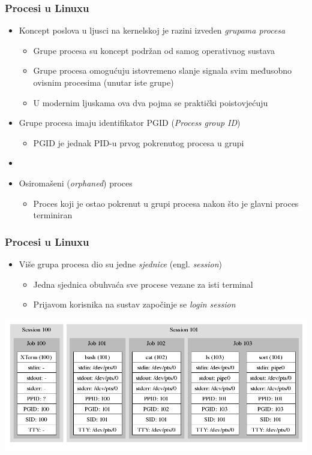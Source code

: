 \documentclass[table,usenames,dvipsnames]{beamer}
\begin{document}
\begin{frame}[t]
	\frametitle{Procesi u Linuxu}
	\begin{itemize}
		\item Koncept poslova u ljusci na kernelskoj je razini izveden \emph{grupama procesa}
		\begin{itemize}
			\item Grupe procesa su koncept podržan od samog operativnog sustava
			\item Grupe procesa omogućuju istovremeno slanje signala svim međusobno ovisnim procesima (unutar iste grupe)
			\item U modernim ljuskama ova dva pojma se praktički poistovjećuju
		\end{itemize}
		\item Grupe procesa imaju identifikator PGID (\emph{Process group ID})
		\begin{itemize}
			\item PGID je jednak PID-u prvog pokrenutog procesa u grupi
		\end{itemize}
		\item[]
		\item Osiromašeni (\emph{orphaned}) proces
		\begin{itemize}
			\item Proces koji je ostao pokrenut u grupi procesa nakon što je glavni proces terminiran
		\end{itemize}
	\end{itemize}
\end{frame}


\begin{frame}[t]
	\frametitle{Procesi u Linuxu}
    \begin{itemize}
	    \item Više grupa procesa dio su jedne \emph{sjednice} (engl. \emph{session})
    	\begin{itemize}
    		\item Jedna sjednica obuhvaća sve procese vezane za isti terminal
    		\item Prijavom korisnika na sustav započinje se \emph{login session}
    	\end{itemize}
    \end{itemize}
    \includegraphics[scale=0.35]{process.png}
\end{frame}
\end{document}
